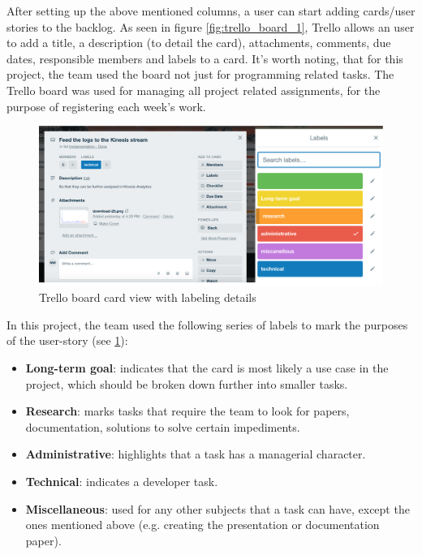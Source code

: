 After setting up the above mentioned columns, a user can start adding cards/user stories to the backlog. As seen in figure \ref{fig:trello_board_1}, Trello allows an user to add a title, a description (to detail the card), attachments, comments, due dates, responsible members and labels to a card.
It's worth noting, that for this project, the team used the board not just for programming related tasks. The Trello board was used for managing all project related assignments, for the purpose of registering each week's work.
\begin{figure}
    \centering
    \includegraphics[width=1\textwidth]{images/card-view.png}
    \caption{Trello board card view with labeling details }
    \label{fig:trello_board_2}
\end{figure}
In this project, the team used the following series of labels to mark the purposes of the user-story (see \ref{fig:trello_board_2}):
    \begin{itemize}
    \item \textbf{Long-term goal}: indicates that the card is most likely a use case in the project, which should be broken down further into smaller tasks.
    \item \textbf{Research}: marks tasks that require the team to look for papers, documentation, solutions to solve certain impediments.
    \item \textbf{Administrative}: highlights that a task has a managerial character.
    \item \textbf{Technical}: indicates a developer task.
    \item \textbf{Miscellaneous}: used for any other subjects that a task can have, except the ones mentioned above (e.g. creating the presentation or documentation paper).
\end{itemize}
    